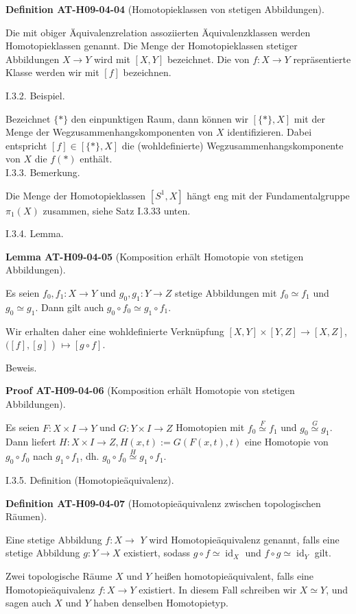 \documentclass[10pt, letterpaper]{article}
\newcommand{\CustomHeading}[3]{%
  \par\medskip\noindent%
  \textbf{#1 #2} \textnormal{(#3)}.\enskip%
}
\newenvironment{DEF}[2]{\begin{unitbox}\CustomHeading{Definition}{#1}{#2}}{\end{unitbox}}
\newenvironment{LEM}[2]{\begin{unitbox}\CustomHeading{Lemma}{#1}{#2}}{\end{unitbox}}
\newenvironment{PROOF}[2]{\begin{unitbox}\CustomHeading{Proof}{#1}{#2}}{\end{unitbox}}
\begin{document}
\begin{DEF}{AT-H09-04-04}{Homotopieklassen von stetigen Abbildungen}
Die mit obiger Äquivalenzrelation assoziierten Äquivalenzklassen werden Homotopieklassen genannt. Die Menge der Homotopieklassen stetiger Abbildungen $X \rightarrow Y$ wird mit $[X, Y]$ bezeichnet. Die von $f: X \rightarrow Y$ repräsentierte Klasse werden wir mit $[f]$ bezeichnen.
\end{DEF}



I.3.2. Beispiel. 

Bezeichnet $\{*\}$ den einpunktigen Raum, dann können wir $[\{*\}, X]$ mit der Menge der Wegzusammenhangskomponenten von $X$ identifizieren. Dabei entspricht $[f] \in[\{*\}, X]$ die (wohldefinierte) Wegzusammenhangskomponente von $X$ die $f(*)$ enthält.\\


I.3.3. Bemerkung. 

Die Menge der Homotopieklassen $\left[S^{1}, X\right]$ hängt eng mit der Fundamentalgruppe $\pi_{1}(X)$ zusammen, siehe Satz I.3.33 unten.


I.3.4. Lemma. 

\begin{LEM}{AT-H09-04-05}{Komposition erhält Homotopie von stetigen Abbildungen}
Es seien $f_{0}, f_{1}: X \rightarrow Y$ und $g_{0}, g_{1}: Y \rightarrow Z$ stetige Abbildungen mit $f_{0} \simeq f_{1}$ und $g_{0} \simeq g_{1}$. Dann gilt auch $g_{0} \circ f_{0} \simeq g_{1} \circ f_{1}$. 

Wir erhalten daher eine wohldefinierte Verknüpfung $[X, Y] \times[Y, Z] \rightarrow[X, Z]$, $([f],[g]$ ) $\mapsto[g \circ f]$.
\end{LEM}


Beweis. 

\begin{PROOF}{AT-H09-04-06}{Komposition erhält Homotopie von stetigen Abbildungen}
Es seien $F: X \times I \rightarrow Y$ und $G: Y \times I \rightarrow Z$ Homotopien mit $f_{0} \stackrel{F}{\simeq} f_{1}$ und $g_{0} \stackrel{G}{\simeq} g_{1}$. Dann liefert $H: X \times I \rightarrow Z, H(x, t):=G(F(x, t), t)$ eine Homotopie von $g_{0} \circ f_{0}$ nach $g_{1} \circ f_{1}$, dh. $g_{0} \circ f_{0} \stackrel{H}{\simeq} g_{1} \circ f_{1}$.
\end{PROOF}



I.3.5. Definition (Homotopieäquivalenz). 


\begin{DEF}{AT-H09-04-07}{Homotopieäquivalenz zwischen topologischen Räumen}
Eine stetige Abbildung $f: X \rightarrow$ $Y$ wird Homotopieäquivalenz genannt, falls eine stetige Abbildung $g: Y \rightarrow X$ existiert, sodass $g \circ f \simeq \operatorname{id}_{X}$ und $f \circ g \simeq \operatorname{id}_{Y}$ gilt. 

Zwei topologische Räume $X$ und $Y$ heißen homotopieäquivalent, falls eine Homotopieäquivalenz $f: X \rightarrow Y$ existiert. In diesem Fall schreiben wir $X \simeq Y$, und sagen auch $X$ und $Y$ haben denselben Homotopietyp.
\end{DEF}
\end{document}
